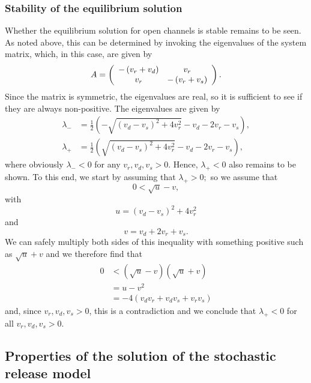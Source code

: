 \subsubsection{Stability of the equilibrium solution}

Whether the equilibrium solution for open channels is stable remains to be seen.
As noted above, this can be determined by invoking the eigenvalues of
the system matrix, which, in this case, are given by
\[
A=\left(
\begin{array}
[c]{cc}
-\left(  v_{r}+v_{d}\right)   & v_{r}\\
v_{r} & -\left(  v_{r}+v_{s}\right)
\end{array}
\right)  .
\]
Since the matrix is symmetric, the eigenvalues are real, so it is sufficient to see if they are always non-positive.
 The eigenvalues are given by
\begin{align*}
\lambda_{-} &  =\frac{1}{2}\left(  -\sqrt{\left(  v_{d}-v_{s}\right)
^{2}+4v_{r}^{2}}-v_{d}-2v_{r}-v_{s}\right)  ,\\
\lambda_{+} &  =\frac{1}{2}\left(  \sqrt{\left(  v_{d}-v_{s}\right)
^{2}+4v_{r}^{2}}-v_{d}-2v_{r}-v_{s}\right),
\end{align*}
where obviously \bigskip$\lambda_{-}<0$ for any $v_{r},v_{d},v_{s}>0.$ Hence,
$\lambda_{+}<0$ also remains to be shown. To this end, we start by
assuming that $\lambda_{+}>0;$ so we assume that
\[
0<\sqrt{u}-v,
\]
with
\[
u=\left(  v_{d}-v_{s}\right)  ^{2}+4v_{r}^{2}
\]
and
\[
v=v_{d}+2v_{r}+v_{s}.
\]
We can safely multiply both sides of this inequality with something positive
such as $\sqrt{u}+v$ and we therefore find that
\begin{align*}
0 &  <\left(  \sqrt{u}-v\right)  \left(  \sqrt{u}+v\right)  \\
&  =u-v^{2}\\
&  =-4\left(  v_{d}v_{r}+v_{d}v_{s}+v_{r}v_{s}\right)
\end{align*}
and, since $v_{r},v_{d},v_{s}>0$, this is a contradiction and we conclude that
$\lambda_{+}<0$ for all $v_{r},v_{d},v_{s}>0.$

\subsection{Properties of the solution of the stochastic release model}

